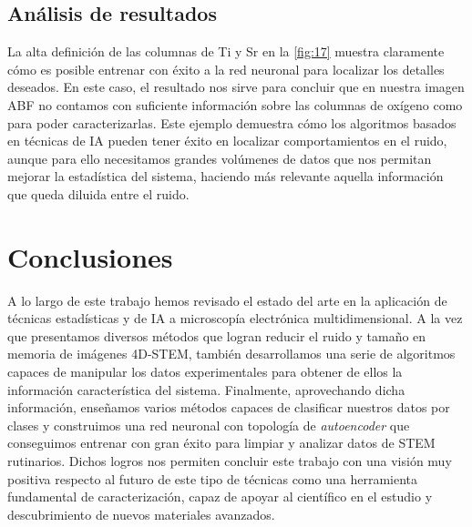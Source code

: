 \vspace{-0.6cm}
\subsection{Análisis de resultados}

La alta definición de las columnas de Ti y Sr en la \autoref{fig:17} muestra claramente cómo es posible entrenar con éxito a la red neuronal para localizar los detalles deseados. En este caso, el resultado nos sirve para concluir que en nuestra imagen ABF no contamos con suficiente información sobre las columnas de oxígeno como para poder caracterizarlas. Este ejemplo demuestra cómo los algoritmos basados en técnicas de IA pueden tener éxito en localizar comportamientos en el ruido, aunque para ello necesitamos grandes volúmenes de datos que nos permitan mejorar la estadística del sistema, haciendo más relevante aquella información que queda diluida entre el ruido.

 \normalsize
\section*{Conclusiones}

A lo largo de este trabajo hemos revisado el estado del arte en la aplicación de técnicas estadísticas y de IA a microscopía electrónica multidimensional. 
A la vez que presentamos diversos métodos que logran reducir el ruido y tamaño en memoria de imágenes 4D-STEM, también desarrollamos una serie de algoritmos capaces de manipular los datos experimentales para obtener de ellos la información característica del sistema. 
Finalmente, aprovechando dicha información, enseñamos varios métodos capaces de clasificar nuestros datos por clases y construimos una red neuronal con topología de \textit{autoencoder} que conseguimos entrenar con gran éxito para limpiar y analizar datos de STEM rutinarios.
Dichos logros nos permiten concluir este trabajo con una visión muy positiva respecto al futuro de este tipo de técnicas como una herramienta fundamental de caracterización, capaz de apoyar al científico en el estudio y descubrimiento de nuevos materiales avanzados.
